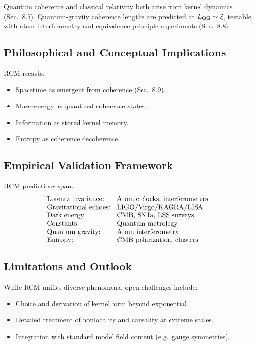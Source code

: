 Quantum coherence and classical relativity both arise from kernel dynamics (Sec.~8.6).  Quantum‐gravity coherence lengths are predicted at $L_{\rm QG}\sim\xi$, testable with atom interferometry and equivalence‐principle experiments (Sec.~8.8).

\subsection{Philosophical and Conceptual Implications}

RCM recasts:
\begin{itemize}
  \item Spacetime as emergent from coherence (Sec.~8.9).
  \item Mass–energy as quantized coherence states.
  \item Information as stored kernel memory.
  \item Entropy as coherence decoherence.
\end{itemize}

\subsection{Empirical Validation Framework}

RCM predictions span:
\[
  \begin{array}{lll}
    \text{Lorentz invariance:} & \text{Atomic clocks, interferometers} \\
    \text{Gravitational echoes:} & \text{LIGO/Virgo/KAGRA/LISA} \\
    \text{Dark energy:} & \text{CMB, SN\,Ia, LSS surveys} \\
    \text{Constants:} & \text{Quantum metrology} \\
    \text{Quantum gravity:} & \text{Atom interferometry} \\
    \text{Entropy:} & \text{CMB polarization, clusters}
  \end{array}
\]

\subsection{Limitations and Outlook}

While RCM unifies diverse phenomena, open challenges include:
\begin{itemize}
  \item Choice and derivation of kernel form beyond exponential.  
  \item Detailed treatment of nonlocality and causality at extreme scales.  
  \item Integration with standard model field content (e.g.\ gauge symmetries).
\end{itemize}

